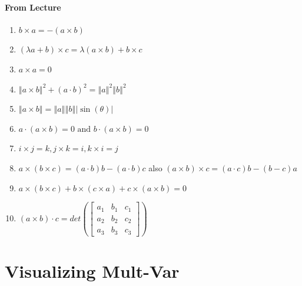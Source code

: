 \documentclass[11pt]{book}
\begin{document}
\paragraph{From Lecture} 
\begin{enumerate}
    \item $b\times a =  - \left( a\times b \right) $ 
    \item $\left( \lambda a + b \right) \times c = \lambda \left( a\times b \right)  + b\times c$ 
    \item $a\times a = 0$ 
    \item $\left\Vert a\times b \right\Vert^2  + \left( a \cdot b \right) ^2 = \left\Vert a \right\Vert ^2 \left\Vert b \right\Vert ^2 $ 
    \item $\left\Vert a\times b \right\Vert = \left\Vert a \right\Vert \left\Vert b \right\Vert \left| \sin  \left( \theta \right)  \right| $ 
    \item $a \cdot \left( a\times b \right) = 0 \text{ and } b \cdot \left( a\times b \right) = 0$ 
    \item $i\times j= k, j\times k= i, k\times i= j$ 
    \item $a\times \left( b\times c \right) = \left( a \cdot b \right) b - \left( a \cdot b \right) c$ also $\left( a\times b \right) \times c = \left( a \cdot c \right) b  -  \left( b - c \right) a$ 
    \item $a\times \left( b\times c \right)  + b\times \left( c\times a \right)  + c \times \left( a\times b \right) = 0$ 
    \item $\left( a\times b \right)  \cdot c = \mathit{det} \left(
            \begin{bmatrix}
            	a_{1}  &b_{1}   & c_{1}  \\
            	a_{2}  &b_{2}   & c_{2}  \\
            	a_{3}  &b_{3}   & c_{3}  
            \end{bmatrix}
        \right) $ 
\end{enumerate}




\section{Visualizing Mult-Var}%
\label{sec:visualizing_mult_var}
\end{document}
